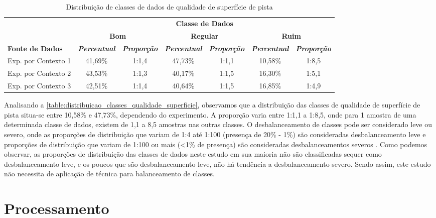 \begin{table}[h]
\caption{Distribuição de classes de dados de qualidade de superfície de pista}
\label{table:distribuicao_classes_qualidade_superficie}
\centering
\scriptsize
\begin{tabular}{lcccccc}
\cmidrule(l){2-7}
\multicolumn{1}{c}{\multirow{2}{*}{\textbf{}}} & 
\multicolumn{6}{c}{\textbf{Classe de Dados}} \\ \cmidrule(l){2-7} 
\multicolumn{1}{c}{} & 
\multicolumn{2}{c}{\textbf{Bom}} & 
\multicolumn{2}{c}{\textbf{Regular}} & 
\multicolumn{2}{c}{\textbf{Ruim}} \\ \midrule
\textbf{Fonte de Dados} & 
\textit{\textbf{Percentual}} & 
\textit{\textbf{Proporção}} & 
\textit{\textbf{Percentual}} & 
\textit{\textbf{Proporção}} & 
\textit{\textbf{Percentual}} & 
\textit{\textbf{Proporção}} \\ \midrule
Exp. por Contexto 1 & 41,69\% & 1:1,4 & 47,73\% & 1:1,1 & 10,58\% & 1:8,5 \\ \midrule
Exp. por Contexto 2 & 43,53\% & 1:1,3 & 40,17\% & 1:1,5 & 16,30\% & 1:5,1 \\ \midrule
Exp. por Contexto 3 & 42,51\% & 1:1,4 & 40,64\% & 1:1,5 & 16,85\% & 1:4,9 \\ \bottomrule
\end{tabular}
\end{table}

Analisando a \autoref{table:distribuicao_classes_qualidade_superficie}, observamos que a distribuição das classes de qualidade de superfície de pista situa-se entre 10,58\% e 47,73\%, dependendo do experimento. A proporção varia entre 1:1,1 a 1:8,5, onde para 1 amostra de uma determinada classe de dados, existem de 1,1 a 8,5 amostras nas outras classes. O desbalanceamento de classes pode ser considerado leve ou severo, onde as proporções de distribuição que variam de 1:4 até 1:100 (presença de 20\% - 1\%) são consideradas desbalanceamento leve e proporções de distribuição que variam de 1:100 ou mais (<1\% de presença) são consideradas desbalanceamentos severos \cite{Krawczyk2016,Brownlee2020}. Como podemos observar, as proporções de distribuição das classes de dados neste estudo em sua maioria não são classificadas sequer como desbalanceamento leve, e os poucos que são desbalanceamento leve, não há tendência a desbalanceamento severo. Sendo assim, este estudo não necessita de aplicação de técnica para balanceamento de classes.

\section{Processamento}

